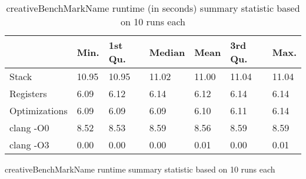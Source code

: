 \begin{table}[h!]
\centering
\begin{tabular}{p{}p{}p{}p{}p{}p{}p{}}
  \hline
 & Min. & 1st Qu. & Median & Mean & 3rd Qu. & Max. \\ 
  \hline
Stack & 10.95 & 10.95 & 11.02 & 11.00 & 11.04 & 11.04 \\ 
  Registers & 6.09 & 6.12 & 6.14 & 6.12 & 6.14 & 6.14 \\ 
  Optimizations & 6.09 & 6.09 & 6.09 & 6.10 & 6.11 & 6.14 \\ 
  clang -O0 & 8.52 & 8.53 & 8.59 & 8.56 & 8.59 & 8.59 \\ 
  clang -O3 & 0.00 & 0.00 & 0.00 & 0.01 & 0.00 & 0.01 \\ 
   \hline
\end{tabular}
\caption{creativeBenchMarkName runtime summary statistic based on 10 runs each}
\caption{creativeBenchMarkName runtime (in seconds) summary statistic based on 10 runs each}
\end{table}
